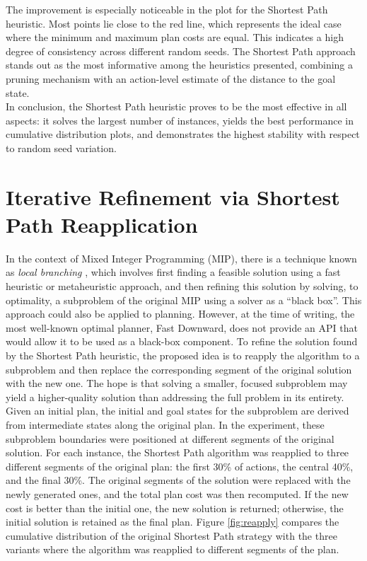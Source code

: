 The improvement is especially noticeable in the plot for the Shortest Path heuristic. Most points lie close to the red line,
which represents the ideal case where the minimum and maximum plan costs are equal. This indicates a high degree of consistency
across different random seeds. The Shortest Path approach stands out as the most informative among the heuristics presented,
combining a pruning mechanism with an action-level estimate of the distance to the goal state.\\
In conclusion, the Shortest Path heuristic proves to be the most effective in all aspects: it solves the largest number of instances,
yields the best performance in cumulative distribution plots, and demonstrates the highest stability with respect to random seed variation.

\section{Iterative Refinement via Shortest Path Reapplication}
In the context of Mixed Integer Programming (MIP), there is a technique known as \textit{local branching} \cite{fischetti2003local},
which involves first finding a feasible solution using a fast heuristic or metaheuristic approach, and then refining this solution by solving,
to optimality, a subproblem of the original MIP using a solver as a ``black box''.
This approach could also be applied to planning. However, at the time of writing, the most well-known optimal planner, Fast Downward,
does not provide an API that would allow it to be used as a black-box component. To refine the solution found by the Shortest Path heuristic,
the proposed idea is to reapply the algorithm to a subproblem and then replace the corresponding segment of the original solution with the new one.
The hope is that solving a smaller, focused subproblem may yield a higher-quality solution than addressing the full problem in its entirety.
Given an initial plan, the initial and goal states for the subproblem are derived from intermediate states along the original plan.
In the experiment, these subproblem boundaries were positioned at different segments of the original solution.
For each instance, the Shortest Path algorithm was reapplied to three different segments of the original plan: the first 30\% of actions,
the central 40\%, and the final 30\%.
The original segments of the solution were replaced with the newly generated ones, and the total plan cost was then recomputed.
If the new cost is better than the initial one, the new solution is returned; otherwise, the initial solution is retained as the final plan.
Figure \ref{fig:reapply} compares the cumulative distribution of the original Shortest Path
strategy with the three variants where the algorithm was reapplied to different segments of the plan.

